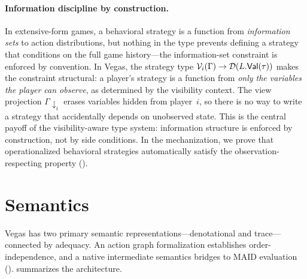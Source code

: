 \documentclass[11pt]{article}
\begin{document}
\paragraph{Information discipline by construction.}
In extensive-form games, a behavioral strategy is a function from
\emph{information sets} to action distributions, but nothing in the type
prevents defining a strategy that conditions on the full game history---the
information-set constraint is enforced by convention.
In Vegas, the strategy type $\mathcal{V}_i(\Gamma) \to \mathcal{D}(L.\mathsf{Val}(\tau))$
makes the constraint structural: a player's strategy is a function from
\emph{only the variables the player can observe}, as determined by the
visibility context. The view projection $\Gamma\!\!\downarrow_i$ erases
variables hidden from player~$i$, so there is no way to write a strategy that
accidentally depends on unobserved state. This is the central payoff of the
visibility-aware type system: information structure is enforced by
construction, not by side conditions. In the mechanization, we prove that
operationalized behavioral strategies automatically satisfy the
observation-respecting property ().


\section{Semantics}\label{sec:semantics}

Vegas has two primary semantic representations---denotational and
trace---connected by adequacy. An action graph formalization establishes
order-independence, and a native intermediate semantics bridges to MAID
evaluation ().  summarizes the architecture.
\end{document}
